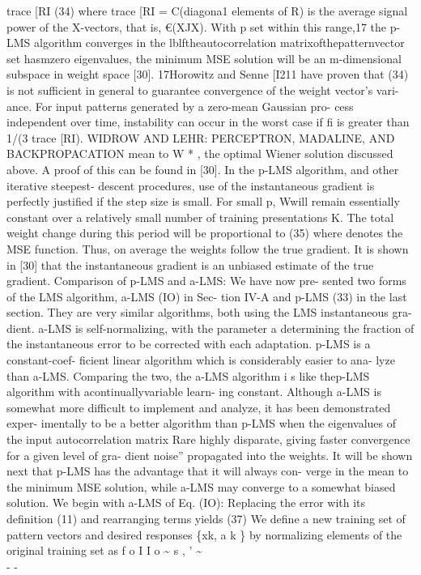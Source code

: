 trace {[}RI (34) where trace {[}RI = C(diagona1 elements of R) is the
average signal power of the X-vectors, that is, €(XJX). With p set
within this range,17 the p-LMS algorithm converges in the
lblftheautocorrelation matrixofthepatternvector set hasmzero
eigenvalues, the minimum MSE solution will be an m-dimensional subspace
in weight space {[}30{]}. 17Horowitz and Senne {[}I211 have proven that
(34) is not sufficient in general to guarantee convergence of the weight
vector's vari- ance. For input patterns generated by a zero-mean
Gaussian pro- cess independent over time, instability can occur in the
worst case if fi is greater than 1/(3 trace {[}RI). WIDROW AND LEHR:
PERCEPTRON, MADALINE, AND BACKPROPACATION mean to W * , the optimal
Wiener solution discussed above. A proof of this can be found in
{[}30{]}. In the p-LMS algorithm, and other iterative steepest- descent
procedures, use of the instantaneous gradient is perfectly justified if
the step size is small. For small p, Wwill remain essentially constant
over a relatively small number of training presentations K. The total
weight change during this period will be proportional to (35) where
denotes the MSE function. Thus, on average the weights follow the true
gradient. It is shown in {[}30{]} that the instantaneous gradient is an
unbiased estimate of the true gradient. Comparison of p-LMS and a-LMS:
We have now pre- sented two forms of the LMS algorithm, a-LMS (IO) in
Sec- tion IV-A and p-LMS (33) in the last section. They are very similar
algorithms, both using the LMS instantaneous gra- dient. a-LMS is
self-normalizing, with the parameter a determining the fraction of the
instantaneous error to be corrected with each adaptation. p-LMS is a
constant-coef- ficient linear algorithm which is considerably easier to
ana- lyze than a-LMS. Comparing the two, the a-LMS algorithm i s like
thep-LMS algorithm with acontinuallyvariable learn- ing constant.
Although a-LMS is somewhat more difficult to implement and analyze, it
has been demonstrated exper- imentally to be a better algorithm than
p-LMS when the eigenvalues of the input autocorrelation matrix Rare
highly disparate, giving faster convergence for a given level of gra-
dient noise'' propagated into the weights. It will be shown next that
p-LMS has the advantage that it will always con- verge in the mean to
the minimum MSE solution, while a-LMS may converge to a somewhat biased
solution. We begin with a-LMS of Eq. (IO): Replacing the error with its
definition (11) and rearranging terms yields (37) We define a new
training set of pattern vectors and desired responses \{xk, a k \} by
normalizing elements of the original training set as f o I I o
\textasciitilde{} s , ' \textasciitilde{}\\
- -

